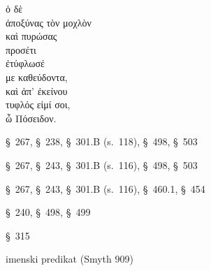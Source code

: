 

{\large
\begin{greek}
\noindent ὁ δὲ \\
\tabto{2em} ἀποξύνας τὸν μοχλὸν \\
\tabto{2em} καὶ πυρώσας \\
\tabto{2em} προσέτι \\
ἐτύφλωσέ \\
\tabto{2em} με καθεύδοντα, \\
καὶ ἀπ' ἐκείνου \\
τυφλός εἰμί σοι, \\
ὦ Πόσειδον.\\

\end{greek}
}

\begin{description}[noitemsep]
\item[ἀποξύνας] §~267, §~238, §~301.B (s.~118), §~498, §~503
\item[πυρώσας] §~267, §~243, §~301.B (s.~116), §~498, §~503
\item[ἐτύφλωσέ] §~267, §~243, §~301.B (s.~116), §~460.1, §~454
\item[καθεύδοντα] §~240, §~498, §~499%
\item[εἰμί] §~315
\item[τυφλός εἰμί] imenski predikat (Smyth 909)

\end{description}



